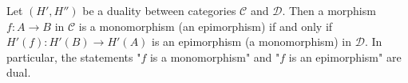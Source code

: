 Let $(H', H'')$ be a duality between categories $\mathcal{C}$ and $\mathcal{D}$. Then a morphism $f: A \to B$ in $\mathcal{C}$ is a monomorphism (an epimorphism) if and only if $H'(f): H'(B) \to H'(A)$ is an epimorphism (a monomorphism) in $\mathcal{D}$. In particular, the statements "$f$ is a monomorphism" and "$f$ is an epimorphism" are dual.
